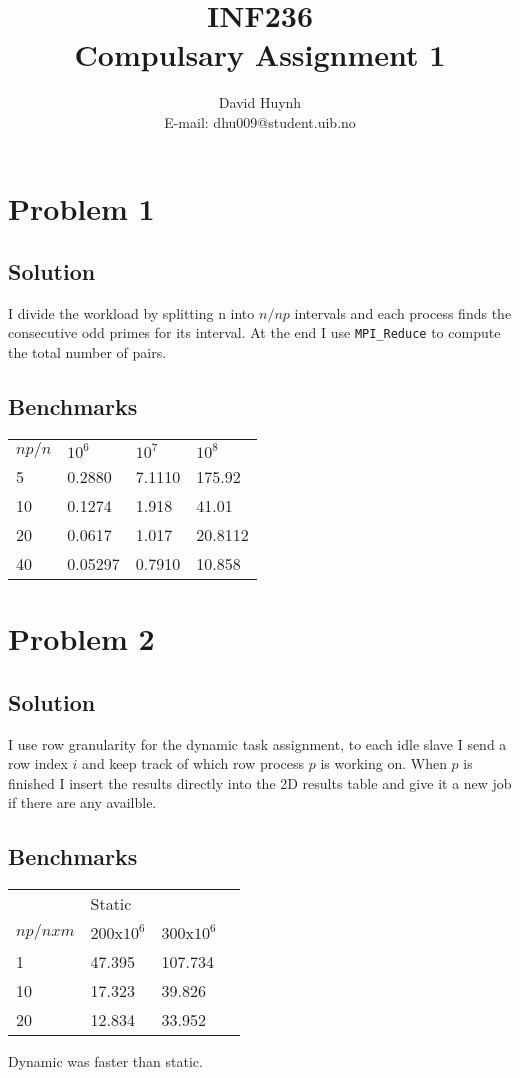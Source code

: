 \documentclass{article}
\begin{document}
\title{INF236\\ Compulsary Assignment 1}
\author{David Huynh\\ E-mail: dhu009@student.uib.no}
\date{}

\maketitle

\section*{Problem 1}

\subsection*{Solution}

I divide the workload by splitting n into $n/np$ intervals and each process finds the consecutive odd primes for its interval. At the end I use \verb|MPI_Reduce| to compute the total number of pairs.

\subsection*{Benchmarks}

\begin{table}[h]
\begin{tabular}{llll}
$np/n$ & $10^{6}$ & $10^{7}$ & $10^{8}$\\
5 & 0.2880 & 7.1110 & 175.92\\
10 & 0.1274 & 1.918 & 41.01\\
20 & 0.0617 & 1.017 & 20.8112\\
40 & 0.05297 & 0.7910 & 10.858
\end{tabular}
\end{table}

\section*{Problem 2}

\subsection*{Solution}

I use row granularity for the dynamic task assignment, to each idle slave I send a row index $i$ and keep track of which row process $p$ is working on. When $p$ is finished I insert the results directly into the 2D results table and give it a new job if there are any availble.

\subsection*{Benchmarks}

\begin{table}[h]
\begin{tabular}{llll}
 & Static & & \\
$np/nxm$ & 200x$10^{6}$ & 300x$10^{6}$ &\\
1 & 47.395 & 107.734 &\\
10 & 17.323 & 39.826 &\\
20 & 12.834 & 33.952 &
\end{tabular}
\end{table}

Dynamic was faster than static.
\end{document}
